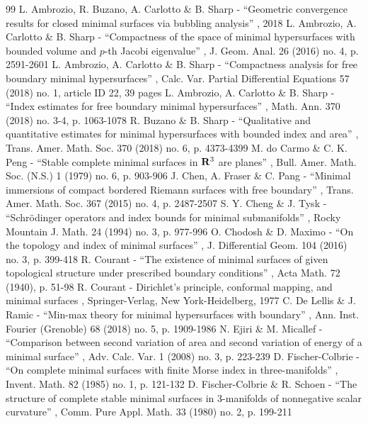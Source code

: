 \begin{thebibliography}{99}
 L. Ambrozio, R. Buzano, A. Carlotto \& B. Sharp - “Geometric convergence results for closed minimal surfaces via bubbling analysis” , 2018
 L. Ambrozio, A. Carlotto \& B. Sharp - “Compactness of the space of minimal hypersurfaces with bounded volume and $p$-th Jacobi eigenvalue” , J. Geom. Anal. 26 (2016) no. 4, p. 2591-2601
 L. Ambrozio, A. Carlotto \& B. Sharp - “Compactness analysis for free boundary minimal hypersurfaces” , Calc. Var. Partial Differential Equations 57 (2018) no. 1, article ID 22, 39 pages
 L. Ambrozio, A. Carlotto \& B. Sharp - “Index estimates for free boundary minimal hypersurfaces” , Math. Ann. 370 (2018) no. 3-4, p. 1063-1078
 R. Buzano \& B. Sharp - “Qualitative and quantitative estimates for minimal hypersurfaces with bounded index and area” , Trans. Amer. Math. Soc. 370 (2018) no. 6, p. 4373-4399
 M. do Carmo \& C. K. Peng - “Stable complete minimal surfaces in ${\bf R}^{3}$ are planes” , Bull. Amer. Math. Soc. (N.S.) 1 (1979) no. 6, p. 903-906
 J. Chen, A. Fraser \& C. Pang - “Minimal immersions of compact bordered Riemann surfaces with free boundary” , Trans. Amer. Math. Soc. 367 (2015) no. 4, p. 2487-2507
 S. Y. Cheng \& J. Tysk - “Schrödinger operators and index bounds for minimal submanifolds” , Rocky Mountain J. Math. 24 (1994) no. 3, p. 977-996
 O. Chodosh \& D. Maximo - “On the topology and index of minimal surfaces” , J. Differential Geom. 104 (2016) no. 3, p. 399-418
 R. Courant - “The existence of minimal surfaces of given topological structure under prescribed boundary conditions” , Acta Math. 72 (1940), p. 51-98
 R. Courant - Dirichlet’s principle, conformal mapping, and minimal surfaces , Springer-Verlag, New York-Heidelberg, 1977
 C. De Lellis \& J. Ramic - “Min-max theory for minimal hypersurfaces with boundary” , Ann. Inst. Fourier (Grenoble) 68 (2018) no. 5, p. 1909-1986
 N. Ejiri \& M. Micallef - “Comparison between second variation of area and second variation of energy of a minimal surface” , Adv. Calc. Var. 1 (2008) no. 3, p. 223-239
 D. Fischer-Colbrie - “On complete minimal surfaces with finite Morse index in three-manifolds” , Invent. Math. 82 (1985) no. 1, p. 121-132
 D. Fischer-Colbrie \& R. Schoen - “The structure of complete stable minimal surfaces in $3$-manifolds of nonnegative scalar curvature” , Comm. Pure Appl. Math. 33 (1980) no. 2, p. 199-211

\end{thebibliography}
